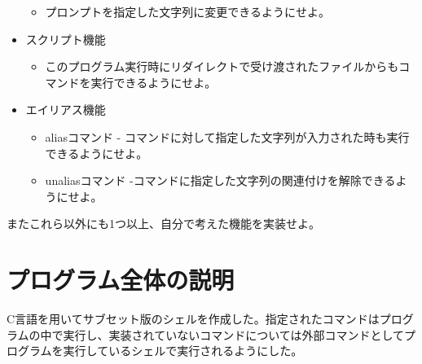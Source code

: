 \documentclass{procreport}
\begin{document}
\begin{itemize}
\begin{itemize}
\item プロンプトを指定した文字列に変更できるようにせよ。
\end{itemize}
\item スクリプト機能
\begin{itemize}
\item このプログラム実行時にリダイレクトで受け渡されたファイルからもコマンドを実行できるようにせよ。
\end{itemize}
\item エイリアス機能
\begin{itemize}
\item aliasコマンド - コマンドに対して指定した文字列が入力された時も実行できるようにせよ。
\item unaliasコマンド -コマンドに指定した文字列の関連付けを解除できるようにせよ。
\end{itemize}
\end{itemize}

またこれら以外にも1つ以上、自分で考えた機能を実装せよ。





\section{プログラム全体の説明}
C言語を用いてサブセット版のシェルを作成した。指定されたコマンドはプログラムの中で実行し、実装されていないコマンドについては外部コマンドとしてプログラムを実行しているシェルで実行されるようにした。
\end{document}
